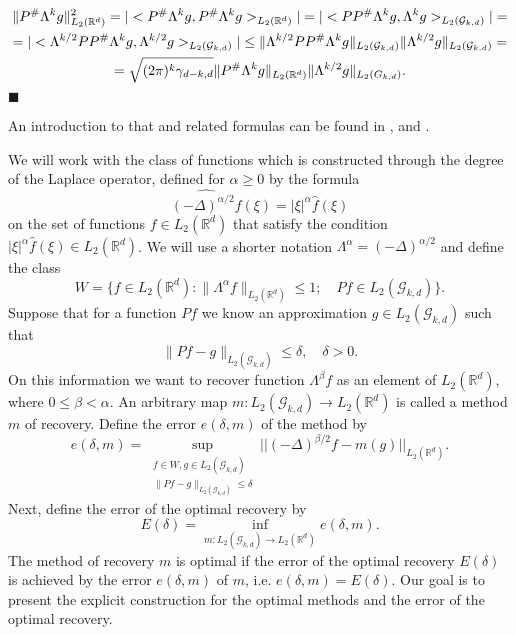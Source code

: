 \documentclass[12pt]{iopart}
\newenvironment{proof}
{\par\noindent{\bf Proof}}
{\hfill$\scriptstyle\blacksquare$}
\begin{document}
	\begin{proof}
		\begin{multline*}
		\|P^\#\Lambda^kg\|_{L_2(\mathbb R^d)}^2=|<P^\#\Lambda^kg,P^\#\Lambda^kg>_{L_2(\mathbb R^d)}|=|<PP^\#\Lambda^kg,\Lambda^kg>_{L_2(\mathcal G_{k,d})}|=\\
		=|<\Lambda^{k/2}PP^\#\Lambda^kg,\Lambda^{k/2}g>_{L_2(\mathcal G_{k,d})}|\le\|\Lambda^{k/2}PP^\#\Lambda^kg\|_{L_2(\mathcal G_{k,d})}\|\Lambda^{k/2}g\|_{L_2(\mathcal G_{k,d})}=\\
		=\sqrt{(2\pi)^k\gamma_{d-k,d}}\|P^\#\Lambda^kg\|_{L_2(\mathbb R^d)}\|\Lambda^{k/2}g\|_{L_2(\mathbb \mathcal G_{k,d})}.
		\end{multline*}
	\end{proof}	   	

An introduction to that and related formulas can be found in \cite{MA},\cite{H} and \cite{K}.

We will work with the class of functions which is constructed through the degree of the Laplace operator, defined for $\alpha\ge 0$ by the formula 
	$$\widehat{(-\Delta)^{\alpha/2}f}(\xi)=|\xi|^\alpha \widehat f(\xi)$$ on the set of functions $f\in L_2(\mathbb R^d)$ that satisfy the condition $|\xi|^\alpha\widehat f(\xi)\in L_2(\mathbb R^d)$.
We will use a shorter notation $\Lambda^\alpha=(-\Delta)^{\alpha/2}$ and define the class 
	$$ W=\{f\in L_2(\mathbb R^d) :
	\|\Lambda^\alpha f\|_{L_2(\mathbb R^d)}\leqslant  1;\quad Pf\in L_2(\mathcal G_{k,d}) \}.  $$
Suppose that for a function $Pf$ we know an approximation $g\in L_2(\mathcal G_{k,d})$ such that
	$$\|Pf-g\|_{L_2(\mathcal G_{k,d})}\le\delta, \quad\delta>0.$$
On this information we want to recover function $\Lambda^\beta f$ as an element of $ L_2(\mathbb R^d)$, where $0\le\beta<\alpha$. An arbitrary map $m:L_2(\mathcal G_{k,d})\rightarrow L_2(\mathbb R^d)$ is called a method $m$ of recovery. Define the error $e(\delta,m)$ of the method by
\[
  e(\delta,m)=\sup_{
  \begin{smallmatrix}
f\in W, g\in L_2(\mathcal G_{k,d})\\ 
\|Pf-g\|_{L_2(\mathcal G_{k,d})}\leqslant \delta
\end{smallmatrix}} ||(-\Delta)^{\beta/2}f-m(g)||_{L_2(\mathbb R^d)}.
\] 
Next, define the error of the optimal recovery by
\begin{equation}
\label{opter}
E(\delta)=\inf_{m:L_2(\mathcal G_{k,d})\rightarrow L_2(\mathbb R^d)}e(\delta,m).
\end{equation}
The method of recovery $m$ is optimal if the error of the optimal recovery $E(\delta)$ is achieved by the error $e(\delta,m)$ of $m$, i.e. $e(\delta,m)=E(\delta)$. Our goal is to present the explicit construction for the optimal methods and the error of the optimal recovery.
\end{document}
